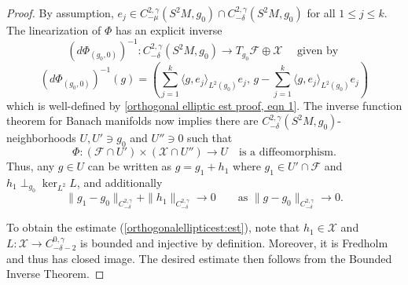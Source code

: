 \documentclass[12pt]{amsart}
\renewcommand{\1}{{\mathbf 1}}
\newtheorem{lemma}[thm]{Lemma}
\theoremstyle{others}
\numberwithin{equation}{section}
\begin{document}
\begin{proof}
    By assumption, $e_j \in C^{2, \gamma}_{-\mu}(S^2M, g_0)\cap C^{2, \gamma}_{-\delta}(S^2M, g_0)$ for all $1 \le j \le k$.
    The linearization of $\Phi$ has an explicit inverse
        $$( d \Phi_{(g_0,0)} )^{-1} : C^{2, \gamma}_{-\delta} (S^2 M, g_0) \to T_{g_0} \mathcal F \oplus \mathcal X \quad \text{ given by } $$
        $$( d \Phi_{(g_0, 0)} )^{-1}(g) = \left( \sum_{j=1}^k \langle g, e_j \rangle_{L^2 (g_0)} e_j, \, g - \sum_{j=1}^k \langle g, e_j \rangle_{L^2 (g_0)} e_j \right)$$
    which is well-defined by \eqref{orthogonal elliptic est proof, eqn 1}.
    The inverse function theorem for Banach manifolds now implies there are $C^{2, \gamma}_{-\delta}(S^2M, g_0)$-neighborhoods $U, U' \ni g_0$ and $U'' \ni 0$ such that 
        $$\Phi : ( \mathcal F \cap U') \times (\mathcal X \cap U'') \to U \quad \text{is a diffeomorphism}.$$
    Thus, any $g \in U$ can be written as $g = g_1 + h_1$ where $g_1 \in U' \cap \mathcal F$ and $h_1 \perp_{g_0} \ker_{L^2} L$, and additionally
    \begin{equation*}
        \| g_1 - g_0 \|_{C^{2, \gamma}_{-\delta}} + \| h_1 \|_{C^{2, \gamma}_{-\delta}} \to 0 \qquad \text{as } \| g - g_0 \|_{C^{2, \gamma}_{-\delta}} \to 0.
    \end{equation*}

    To obtain the estimate (\ref{orthogonalellipticest:est}), note that $h_1 \in \mathcal{X}$ and $L : \mathcal{X} \to C^{0, \gamma}_{-\delta - 2}$ is bounded and injective by definition. Moreover, it is Fredholm  \cite[Prop. 5.1]{DeruelleOzuch20} and thus has closed image. The desired estimate then follows from the Bounded Inverse Theorem.
\end{proof}

\end{document}
